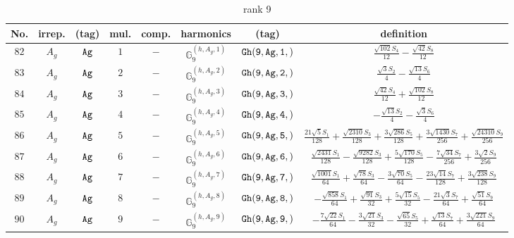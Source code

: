 \documentclass[fleqn,8pt]{jsarticle}
\begin{document}
\begin{table}[ht!]
\begin{center}
\caption{rank 9}
\renewcommand{\arraystretch}{1.3}
\begin{tabular}{cccccccc} \hline \hline
No. & irrep. & (tag) & mul. & comp. & harmonics & (tag) & definition \\ \hline
$ 82 $ & $ A_{g} $ & $ {\tt Ag} $ & $ 1 $ & $ - $ & $ \mathbb{G}_{9}^{(h,A_{g},1)} $ & $ {\tt Gh(9,Ag,1,)} $ & $ \frac{\sqrt{102} S_{4}}{12} - \frac{\sqrt{42} S_{8}}{12} $ \\
$ 83 $ & $ A_{g} $ & $ {\tt Ag} $ & $ 2 $ & $ - $ & $ \mathbb{G}_{9}^{(h,A_{g},2)} $ & $ {\tt Gh(9,Ag,2,)} $ & $ \frac{\sqrt{3} S_{2}}{4} - \frac{\sqrt{13} S_{6}}{4} $ \\
$ 84 $ & $ A_{g} $ & $ {\tt Ag} $ & $ 3 $ & $ - $ & $ \mathbb{G}_{9}^{(h,A_{g},3)} $ & $ {\tt Gh(9,Ag,3,)} $ & $ \frac{\sqrt{42} S_{4}}{12} + \frac{\sqrt{102} S_{8}}{12} $ \\
$ 85 $ & $ A_{g} $ & $ {\tt Ag} $ & $ 4 $ & $ - $ & $ \mathbb{G}_{9}^{(h,A_{g},4)} $ & $ {\tt Gh(9,Ag,4,)} $ & $ - \frac{\sqrt{13} S_{2}}{4} - \frac{\sqrt{3} S_{6}}{4} $ \\
$ 86 $ & $ A_{g} $ & $ {\tt Ag} $ & $ 5 $ & $ - $ & $ \mathbb{G}_{9}^{(h,A_{g},5)} $ & $ {\tt Gh(9,Ag,5,)} $ & $ \frac{21 \sqrt{5} S_{1}}{128} + \frac{\sqrt{2310} S_{3}}{128} + \frac{3 \sqrt{286} S_{5}}{128} + \frac{3 \sqrt{1430} S_{7}}{256} + \frac{\sqrt{24310} S_{9}}{256} $ \\
$ 87 $ & $ A_{g} $ & $ {\tt Ag} $ & $ 6 $ & $ - $ & $ \mathbb{G}_{9}^{(h,A_{g},6)} $ & $ {\tt Gh(9,Ag,6,)} $ & $ \frac{\sqrt{2431} S_{1}}{128} - \frac{\sqrt{9282} S_{3}}{128} + \frac{5 \sqrt{170} S_{5}}{128} - \frac{7 \sqrt{34} S_{7}}{256} + \frac{3 \sqrt{2} S_{9}}{256} $ \\
$ 88 $ & $ A_{g} $ & $ {\tt Ag} $ & $ 7 $ & $ - $ & $ \mathbb{G}_{9}^{(h,A_{g},7)} $ & $ {\tt Gh(9,Ag,7,)} $ & $ \frac{\sqrt{1001} S_{1}}{64} + \frac{\sqrt{78} S_{3}}{64} - \frac{3 \sqrt{70} S_{5}}{64} - \frac{23 \sqrt{14} S_{7}}{128} + \frac{3 \sqrt{238} S_{9}}{128} $ \\
$ 89 $ & $ A_{g} $ & $ {\tt Ag} $ & $ 8 $ & $ - $ & $ \mathbb{G}_{9}^{(h,A_{g},8)} $ & $ {\tt Gh(9,Ag,8,)} $ & $ - \frac{\sqrt{858} S_{1}}{64} + \frac{\sqrt{91} S_{3}}{32} + \frac{5 \sqrt{15} S_{5}}{32} - \frac{21 \sqrt{3} S_{7}}{64} + \frac{\sqrt{51} S_{9}}{64} $ \\
$ 90 $ & $ A_{g} $ & $ {\tt Ag} $ & $ 9 $ & $ - $ & $ \mathbb{G}_{9}^{(h,A_{g},9)} $ & $ {\tt Gh(9,Ag,9,)} $ & $ - \frac{7 \sqrt{22} S_{1}}{64} - \frac{3 \sqrt{21} S_{3}}{32} - \frac{\sqrt{65} S_{5}}{32} + \frac{\sqrt{13} S_{7}}{64} + \frac{3 \sqrt{221} S_{9}}{64} $ \\

\end{tabular}
\end{center}
\end{table}
\end{document}
